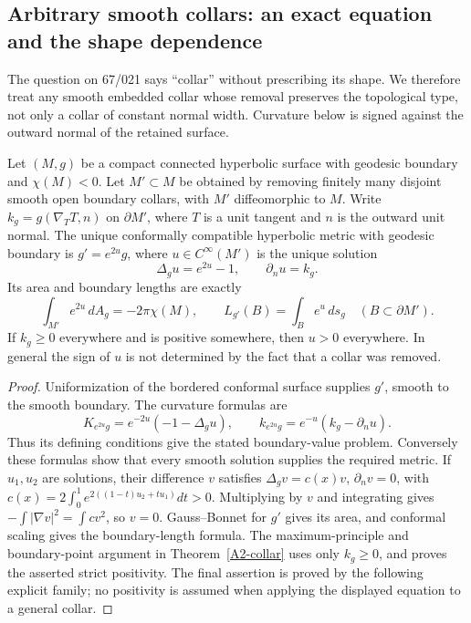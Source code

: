 \subsection{Arbitrary smooth collars: an exact equation and the shape dependence}
The question on 67/021 says ``collar'' without prescribing its shape. We therefore treat any smooth embedded collar whose removal preserves the topological type, not only a collar of constant normal width. Curvature below is signed against the outward normal of the retained surface.

\begin{theorem}\label{A2-collar-general}
Let $(M,g)$ be a compact connected hyperbolic surface with geodesic boundary and $\chi(M)<0$. Let $M'\subset M$ be obtained by removing finitely many disjoint smooth open boundary collars, with $M'$ diffeomorphic to $M$. Write $k_g=g(\nabla_TT,n)$ on $\partial M'$, where $T$ is a unit tangent and $n$ is the outward unit normal. The unique conformally compatible hyperbolic metric with geodesic boundary is $g'=e^{2u}g$, where $u\in C^\infty(M')$ is the unique solution
\[
 \Delta_g u=e^{2u}-1,\qquad \partial_nu=k_g.
\]
Its area and boundary lengths are exactly
\[
 \int_{M'}e^{2u}\,dA_g=-2\pi\chi(M),\qquad
 L_{g'}(B)=\int_B e^u\,ds_g\quad(B\subset\partial M').
\]
If $k_g\ge0$ everywhere and is positive somewhere, then $u>0$ everywhere. In general the sign of $u$ is not determined by the fact that a collar was removed.
\end{theorem}
\begin{proof}
Uniformization of the bordered conformal surface supplies $g'$, smooth to the smooth boundary. The curvature formulas are
\[
 K_{e^{2u}g}=e^{-2u}(-1-\Delta_g u),\qquad
 k_{e^{2u}g}=e^{-u}(k_g-\partial_nu).
\]
Thus its defining conditions give the stated boundary-value problem. Conversely these formulas show that every smooth solution supplies the required metric. If $u_1,u_2$ are solutions, their difference $v$ satisfies $\Delta_gv=c(x)v$, $\partial_nv=0$, with
$c(x)=2\int_0^1e^{2((1-t)u_2+tu_1)}dt>0$. Multiplying by $v$ and integrating gives
$-\int|\nabla v|^2=\int cv^2$, so $v=0$.
Gauss--Bonnet for $g'$ gives its area, and conformal scaling gives the boundary-length formula. The maximum-principle and boundary-point argument in Theorem~\ref{A2-collar} uses only $k_g\ge0$, and proves the asserted strict positivity. The final assertion is proved by the following explicit family; no positivity is assumed when applying the displayed equation to a general collar.
\end{proof}

